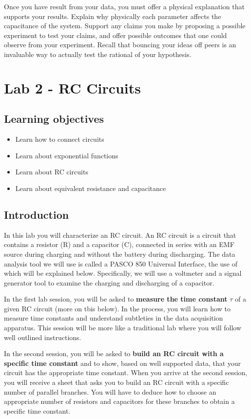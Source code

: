 \documentclass[12pt]{report}
\begin{document}
Once you have  result from your data, you must offer a physical explanation that supports your results. {\color{blue} Explain why physically each parameter affects the capacitance of the system. Support any claims you make by proposing a possible experiment to test your claims, and offer possible outcomes that one could observe from your experiment.} Recall that bouncing your ideas off peers is an invaluable way to actually test the rational of your hypothesis.

\chapter{Lab 2 - RC Circuits}
\section{Learning objectives}
\begin{itemize}
\item Learn how to connect circuits
\item Learn about exponential functions
\item Learn about RC circuits
\item Learn about equivalent resistance and capacitance
\end{itemize}

\section{Introduction}
In this lab you will characterize an RC circuit. An RC circuit is a circuit that contains a resistor (R) and a capacitor (C), connected in series with an EMF source during charging and without the battery during discharging.  
The data analysis tool we will use is called a PASCO 850 Universal Interface, the use of which will be explained below. 
Specifically, we will  use a voltmeter and a 
signal generator tool to examine the charging and discharging of a capacitor. 

In the first lab session, you will be asked to \textbf{measure the time constant} $\tau$ of a given RC circuit (more on tbis below). 
In the process, you will learn how to measure time constants and understand subtleties in the data acquisition apparatus. 
This session will be more like a traditional lab where you will follow well outlined instructions. 

In the second session, you will be asked to \textbf{build an RC circuit with a specific time constant} and to show, based on well supported data, that your circuit has the appropriate time constant. 
When you arrive at the second session, you will receive a sheet that asks you to build an RC circuit with a specific number of parallel branches. 
You will have to deduce how to choose an appropriate number of resistors and capacitors for these branches to obtain a specific time constant.
\end{document}
